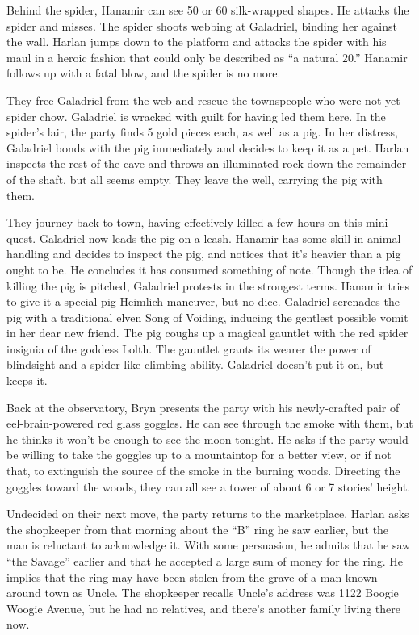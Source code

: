 \documentclass[smalldemyvopaper,11pt,twoside,onecolumn,openright,extrafontsizes]{memoir}
\begin{document}
Behind the spider, Hanamir can see 50 or 60 silk-wrapped shapes. He
attacks the spider and misses. The spider shoots webbing at Galadriel,
binding her against the wall. Harlan jumps down to the platform and
attacks the spider with his maul in a heroic fashion that could only be
described as ``a natural 20.'' Hanamir follows up with a fatal blow, and
the spider is no more.

They free Galadriel from the web and rescue the townspeople who were not
yet spider chow. Galadriel is wracked with guilt for having led them
here. In the spider's lair, the party finds 5 gold pieces each, as well
as a pig. In her distress, Galadriel bonds with the pig immediately and
decides to keep it as a pet. Harlan inspects the rest of the cave and
throws an illuminated rock down the remainder of the shaft, but all
seems empty. They leave the well, carrying the pig with them.

They journey back to town, having effectively killed a few hours on this
mini quest. Galadriel now leads the pig on a leash. Hanamir has some
skill in animal handling and decides to inspect the pig, and notices
that it's heavier than a pig ought to be. He concludes it has consumed
something of note. Though the idea of killing the pig is pitched,
Galadriel protests in the strongest terms. Hanamir tries to give it a
special pig Heimlich maneuver, but no dice. Galadriel serenades the pig
with a traditional elven Song of Voiding, inducing the gentlest possible
vomit in her dear new friend. The pig coughs up a magical gauntlet with
the red spider insignia of the goddess Lolth. The gauntlet grants its
wearer the power of blindsight and a spider-like climbing ability.
Galadriel doesn't put it on, but keeps it.

Back at the observatory, Bryn presents the party with his newly-crafted
pair of eel-brain-powered red glass goggles. He can see through the
smoke with them, but he thinks it won't be enough to see the moon
tonight. He asks if the party would be willing to take the goggles up to
a mountaintop for a better view, or if not that, to extinguish the
source of the smoke in the burning woods. Directing the goggles toward
the woods, they can all see a tower of about 6 or 7 stories' height.

Undecided on their next move, the party returns to the marketplace.
Harlan asks the shopkeeper from that morning about the ``B'' ring he saw
earlier, but the man is reluctant to acknowledge it. With some
persuasion, he admits that he saw ``the Savage'' earlier and that he
accepted a large sum of money for the ring. He implies that the ring may
have been stolen from the grave of a man known around town as Uncle. The
shopkeeper recalls Uncle's address was 1122 Boogie Woogie Avenue, but he
had no relatives, and there's another family living there now.
\end{document}
